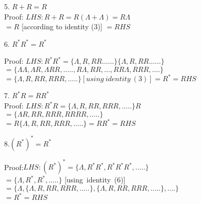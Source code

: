 	\begin{frame}		
\!\!\!\!\!\!\!\!\!\!\!\!\!\!\!\!\!\!\!\!\begin{solution}
\begin{listing} 
   5. $R+ R = R$\\\vspace{2mm}
\quad   Proof: $LHS: R + R = R(\Lambda +\Lambda) = R \Lambda$\\
\qquad\qquad$= R$ [according to identity (3)] $= RHS$\\\vspace{2mm}

   6. $R^*R^* = R^* $\\\vspace{2mm}

\quad Proof: $LHS: R^*R^* = \{\Lambda, R, RR……\} \{\Lambda, R, RR……\}$\\
\qquad\qquad$= \{\Lambda\Lambda, \Lambda R, \Lambda RR, ….., R\Lambda, RR, …, RRΛ, RRR, …. \}$\\
\qquad\qquad$= \{Λ, R, RR, RRR, ….. \} [using\ identity\ (3)] = R^* = RHS$
\end{listing}
\end{solution}		
	\end{frame}	
	\begin{frame}		
\!\!\!\!\!\!\!\!\!\!\!\!\!\!\!\!\!\!\!\!\begin{solution}
\begin{listing} 
   7. $R^*R = RR^*$\\\vspace{2mm}
\quad Proof: $LHS: R^*R = \{\Lambda, R, RR, RRR, ….. \} R$\\
\qquad\qquad$ = \{\Lambda R, RR, RRR, RRRR, ….. \}$\\
\qquad\qquad$=  R\{\Lambda, R, RR, RRR, ….. \} = RR^* = RHS$\vspace{2mm}

   8.$ (R^*)^* = R^*$\\\vspace{2mm}

\quad Proof:$ LHS: (R^*)^* = \{\Lambda, R^*R^*, R^*R^*R^*, ….. \}$\\
\qquad\qquad$= \{\Lambda, R^*, R^*, ….. \}$ [using\ identity\ (6)]\\
\qquad\qquad$= \{\Lambda, \{\Lambda, R, RR, RRR, ….. \}, \{\Lambda, R, RR, RRR, ….. \}, …. \}$\\
             \qquad\qquad $=  R^* =  RHS$
\end{listing}
\end{solution}		
	\end{frame}	
